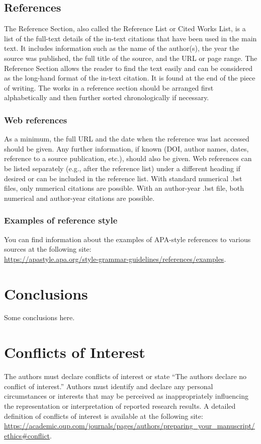 \documentclass[12pt,a4paper]{article}
\begin{document}
\subsection{References}
The Reference Section, also called the Reference List or Cited Works List, is a list of the full-text details of the in-text citations that have been used in the main text. It includes information such as the name of the author(s), the year the source was published, the full title of the source, and the URL or page range. The Reference Section allows the reader to find the text easily and can be considered as the long-hand format of the in-text citation. It is found at the end of the piece of writing. The works in a reference section should be arranged first alphabetically and then further sorted chronologically if necessary.

\subsubsection{Web references}
As a minimum, the full URL and the date when the reference was last accessed should be given. Any further information, if known (DOI, author names, dates, reference to a source publication, etc.), should also be given. Web references can be listed separately (e.g., after the reference list) under a different heading if desired or can be included in the reference list. With standard numerical .bst files, only numerical citations are possible. With an author-year .bst file, both numerical and author-year citations are possible. 

\subsubsection{Examples of reference style}
You can find information about the examples of APA-style references to various sources at the following site:\\
\url{https://apastyle.apa.org/style-grammar-guidelines/references/examples}.


\section{Conclusions}
Some conclusions here.


\section*{Conflicts of Interest} 
The authors must declare conflicts of interest or state “The authors declare no conflict of interest.” Authors must identify and declare any personal circumstances or interests that may be perceived as inappropriately influencing the representation or interpretation of reported research results. A detailed definition of conflicts of interest is available at the following site: \url{https://academic.oup.com/journals/pages/authors/preparing_your_manuscript/ethics#conflict}.
\end{document}
